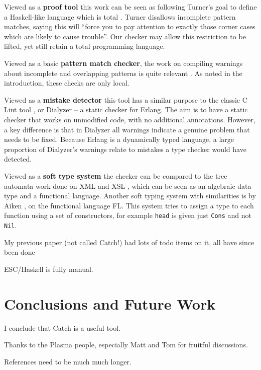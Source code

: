 \documentclass[preprint]{sigplanconf}
\newcommand{\T}[1]{\texttt{#1}}
\begin{document}
Viewed as a \textbf{proof tool} this work can be seen as following Turner's goal to define a Haskell-like language which is total \cite{tfp:total}. Turner disallows incomplete pattern matches, saying this will ``force you to pay attention to exactly those corner cases which are likely to cause trouble''. Our checker may allow this restriction to be lifted, yet still retain a total programming language.

Viewed as a basic \textbf{pattern match checker}, the work on compiling warnings about incomplete and overlapping patterns is quite relevant \cite{ghc,pattern_match}. As noted in the introduction, these checks are only local.

Viewed as a \textbf{mistake detector} this tool has a similar purpose to the classic C Lint tool \cite{lint}, or Dialyzer \cite{dialyzer} -- a static checker for Erlang. The aim is to have a static checker that works on unmodified code, with no additional annotations. However, a key difference is that in Dialyzer all warnings indicate a genuine problem that needs to be fixed. Because Erlang is a dynamically typed language, a large proportion of Dialyzer's warnings relate to mistakes a type checker would have detected.

Viewed as a \textbf{soft type system} the checker can be compared to the tree automata work done on XML and XSL \cite{static_xslt}, which can be seen as an algebraic data type and a functional language. Another soft typing system with similarities is by Aiken \cite{type:dynamic}, on the functional language FL. This system tries to assign a type to each function using a set of constructors, for example \T{head} is given just \T{Cons} and not \T{Nil}.

My previous paper (not called Catch!) had lots of todo items on it, all have since been done

ESC/Haskell is fully manual.


\section{Conclusions and Future Work}
\label{sec:conclusion}

I conclude that Catch is a useful tool.




%

\acks

Thanks to the Plasma people, especially Matt and Tom for fruitful discussions.

References need to be much much longer.



\end{document}
